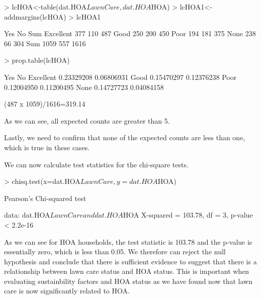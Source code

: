 \documentclass{article}
\begin{document}
\begin{Schunk}
\begin{Sinput}
> lcHOA<-table(dat.HOA$LawnCare,dat.HOA$HOA)
> lcHOA1<-addmargins(lcHOA)
> lcHOA1
\end{Sinput}
\begin{Soutput}
             Yes   No  Sum
  Excellent  377  110  487
  Good       250  200  450
  Poor       194  181  375
  None       238   66  304
  Sum       1059  557 1616
\end{Soutput}
\begin{Sinput}
> prop.table(lcHOA)
\end{Sinput}
\begin{Soutput}
                   Yes         No
  Excellent 0.23329208 0.06806931
  Good      0.15470297 0.12376238
  Poor      0.12004950 0.11200495
  None      0.14727723 0.04084158
\end{Soutput}
\end{Schunk}
(487 x 1059)/1616=319.14

As we can see, all expected counts are greater than 5.

Lastly, we need to confirm that none of the expected counts are less than one, which is true in these cases. 

We can now calculate test statistics for the chi-square tests. 
\begin{Schunk}
\begin{Sinput}
> chisq.test(x=dat.HOA$LawnCare,y=dat.HOA$HOA)
\end{Sinput}
\begin{Soutput}
	Pearson's Chi-squared test

data:  dat.HOA$LawnCare and dat.HOA$HOA
X-squared = 103.78, df = 3, p-value < 2.2e-16
\end{Soutput}
\end{Schunk}

As we can see for HOA households, the test statistic is 103.78 and the p-value is essentially zero, which is less than 0.05. We therefore can reject the null hypothesis and conclude that there is sufficient evidence to suggest that there is a relationship between lawn care status and HOA status. This is important when evaluating sustainbility factors and HOA status as we have found now that lawn care is now significantly related to HOA.
\end{document}
